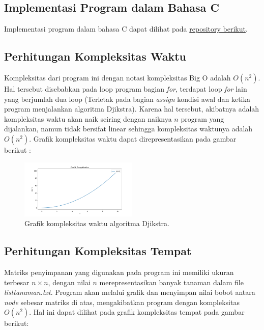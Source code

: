 \documentclass[conference]{IEEEtran}
\begin{document}
\subsection{Implementasi Program dalam Bahasa C}
    Implementasi program dalam bahasa C dapat dilihat
    pada \href{https://github.com/ReynaldoAverill/
    Tugas7PMC}{repository berikut}.

\subsection{Perhitungan Kompleksitas Waktu}
    Kompleksitas dari program ini dengan notasi kompleksitas
    Big O adalah $O(n^2)$. Hal tersebut disebabkan pada loop
    program bagian \textit{for}, terdapat loop \textit{for} lain yang berjumlah
    dua loop (Terletak pada bagian \textit{assign} kondisi awal dan ketika
    program menjalankan algoritma Djikstra). Karena hal tersebut,
    akibatnya adalah kompleksitas waktu akan naik seiring dengan
    naiknya $n$ program yang dijalankan, namun tidak bersifat
    linear sehingga kompleksitas waktunya adalah $O(n^2)$. Grafik
    kompleksitas waktu dapat direpresentasikan pada gambar berikut :

    \begin{figure}[htbp]
        \centerline{\includegraphics[width=0.5\textwidth]{./sources/onn.png}}
        \caption{Grafik kompleksitas waktu algoritma Djikstra.}
        \label{fig8}
    \end{figure}

\subsection{Perhitungan Kompleksitas Tempat}
    Matriks penyimpanan yang digunakan pada program ini
    memiliki ukuran terbesar $n \times n$, dengan nilai $n$ merepresentasikan banyak tanaman dalam file \textit{listtanaman.txt}. Program
    akan melalui grafik dan menyimpan nilai bobot antara \textit{node}
    sebesar matriks di atas, mengakibatkan program dengan kompleksitas $O(n^2)$. Hal ini dapat dilihat pada grafik kompleksitas
    tempat pada gambar berikut:
\end{document}

